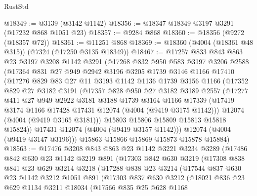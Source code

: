 \begin{lexlean}{RustStd}
\begin{coremodule}
@18349 := @3139 (@3142 @1142)
@18356 := @18347 @18349 @3197 @3291 (@17232 @868 @1051 @23)
@18357 := @9284 @868
@18360 := @18356 (@9272 (@18357 @72))
@18361 := @11251 @868
@18369 := @18360 (@4004 (@18361 @48 @315)) (@7324 (@17250 @3135 @18349))
@18467 := @17257
    @833
    @843
    @863
    @23
    @3197
    @3208
    @1142
    @3291
    (@17268
      @832
      @950
      @583
      @3197
      @3206
      @2588
      (@17364
        @831
        @27
        @949
        @2942
        @3196
        @3205
        @1739
        @3146
        @1166
        @17410
        (@17276
          @829
          @83
          @27
          @11
          @3193
          @1142
          @1136
          @1739
          @3156
          @1166
          (@17352
            @829
            @27
            @3182
            @3191
            (@17357
              @828
              @950
              @27
              @3182
              @3189
              @2557
              (@17277
                @411
                @27
                @949
                @2922
                @3181
                @3188
                @1739
                @3164
                @1166
                @17339
                (@17419 @3174 @1166 @17428 @17431 @12074 (@4004 (@9419 @3175 @1142)))
                @12074
                (@4004 (@9419 @3165 @3181)))
              @15803
              @15806
              @15809
              @15813
              @15818
              @15824))
          @17431
          @12074
          (@4004 (@9419 @3157 @1142)))
        @12074
        (@4004 (@9419 @3147 @3196)))
      @15863
      @15866
      @15869
      @15873
      @15878
      @15884)
@18563 := @17476
    @3208
    @843
    @863
    @23
    @1142
    @3221
    @3234
    @3289
    (@17486
      @842
      @630
      @23
      @1142
      @3219
      @891
      (@17303
        @842
        @630
        @3219
        (@17308
          @838
          @841
          @23
          @629
          @3214
          @3218
          (@17288
            @838
            @23
            @3214
            (@17544
              @837
              @630
              @23
              @1142
              @3212
              @1051
              @891
              (@17303
                @837
                @630
                @3212
                (@18021
                  @836
                  @23
                  @629
                  @1134
                  @3211
                  @18034
                  (@17566
                    @835
                    @25
                    @628
                    @1168

\end{coremodule}
\end{lexlean}
